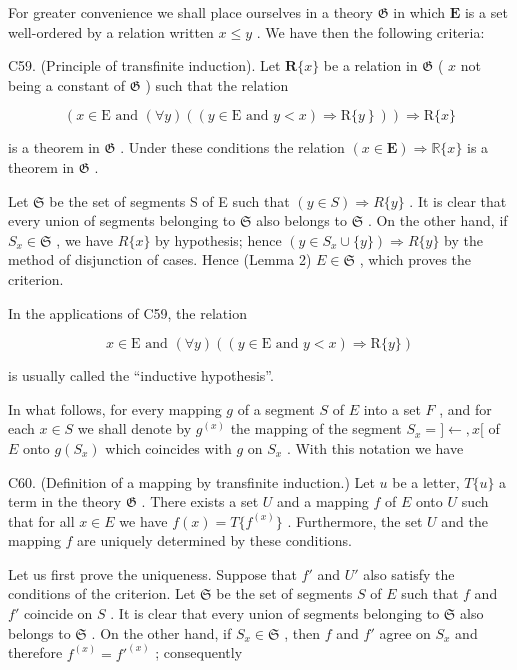 For greater convenience we shall place ourselves in a theory \(\mathfrak{G}\) in which \(\mathbf{E}\) is a set well-ordered by a relation written \(x \leqslant y\) . We have then the following criteria:

C59. (Principle of transfinite induction). Let \(\mathbf{R}\{x\}\) be a relation in \(\mathfrak{G}\) ( \(x\) not being a constant of \(\mathfrak{G}\) ) such that the relation

\[
(x \in \mathrm{E} \text { and } (\forall y) ((y \in \mathrm{E} \text { and } y <   x) \Longrightarrow \mathrm{R} \{\left. y \right\})) \Longrightarrow \mathrm{R} \{x \}
\]

is a theorem in \(\mathfrak{G}\) . Under these conditions the relation \((x\in \mathbf{E})\Rightarrow \mathbb{R}\{x\}\) is a theorem in \(\mathfrak{G}\) .

Let \(\mathfrak{S}\) be the set of segments S of E such that \((y\in S)\Longrightarrow R\{y\}\) . It is clear that every union of segments belonging to \(\mathfrak{S}\) also belongs to \(\mathfrak{S}\) . On the other hand, if \(S_x\in \mathfrak{S}\) , we have \(R\{x\}\) by hypothesis; hence \((y\in S_x\cup \{y\})\Longrightarrow R\{y\}\) by the method of disjunction of cases. Hence (Lemma 2) \(E\in \mathfrak{S}\) , which proves the criterion.

In the applications of C59, the relation

\[
x \in \mathrm{E} \text {   and   } (\forall y) ((y \in \mathrm{E} \text {   and   } y <   x) \Longrightarrow \mathrm{R} \{y \})
\]

is usually called the ``inductive hypothesis''.

In what follows, for every mapping \(g\) of a segment \(S\) of \(E\) into a set \(F\) , and for each \(x \in S\) we shall denote by \(g^{(x)}\) the mapping of the segment \(S_x = ] \leftarrow, x[\) of \(E\) onto \(g(S_x)\) which coincides with \(g\) on \(S_x\) . With this notation we have

C60. (Definition of a mapping by transfinite induction.) Let \(u\) be a letter, \(T\{u\}\) a term in the theory \(\mathfrak{G}\) . There exists a set \(U\) and a mapping \(f\) of \(E\) onto \(U\) such that for all \(x \in E\) we have \(f(x) = T\{f^{(x)}\}\) . Furthermore, the set \(U\) and the mapping \(f\) are uniquely determined by these conditions.

Let us first prove the uniqueness. Suppose that \(f'\) and \(U'\) also satisfy the conditions of the criterion. Let \(\mathfrak{S}\) be the set of segments \(S\) of \(E\) such that \(f\) and \(f'\) coincide on \(S\) . It is clear that every union of segments belonging to \(\mathfrak{S}\) also belongs to \(\mathfrak{S}\) . On the other hand, if \(S_x \in \mathfrak{S}\) , then \(f\) and \(f'\) agree on \(S_x\) and therefore \(f^{(x)} = f'^{(x)}\) ; consequently

